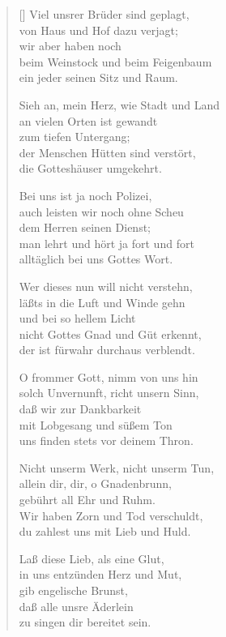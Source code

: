 \begin{multicols}{2}
\begin{verse}[\versewidth]
 Viel unsrer Brüder sind geplagt,\\
von Haus und Hof dazu verjagt;\\
wir aber haben noch\\
beim Weinstock und beim Feigenbaum\\
ein jeder seinen Sitz und Raum.

 Sieh an, mein Herz, wie Stadt und Land\\
an vielen Orten ist gewandt\\
zum tiefen Untergang;\\
der Menschen Hütten sind verstört,\\
die Gotteshäuser umgekehrt.

 Bei uns ist ja noch Polizei,\\
auch leisten wir noch ohne Scheu\\
dem Herren seinen Dienst;\\
man lehrt und hört ja fort und fort\\
alltäglich bei uns Gottes Wort.

 Wer dieses nun will nicht verstehn,\\
läßts in die Luft und Winde gehn\\
und bei so hellem Licht\\
nicht Gottes Gnad und Güt erkennt,\\
der ist fürwahr durchaus verblendt.

 O frommer Gott, nimm von uns hin\\
solch Unvernunft, richt unsern Sinn,\\
daß wir zur Dankbarkeit\\
mit Lobgesang und süßem Ton\\
uns finden stets vor deinem Thron.

 Nicht unserm Werk, nicht unserm Tun,\\
allein dir, dir, o Gnadenbrunn,\\
gebührt all Ehr und Ruhm.\\
Wir haben Zorn und Tod verschuldt,\\
du zahlest uns mit Lieb und Huld.

 Laß diese Lieb, als eine Glut,\\
in uns entzünden Herz und Mut,\\
gib engelische Brunst,\\
daß alle unsre Äderlein\\
zu singen dir bereitet sein.


\end{verse}
\end{multicols}

